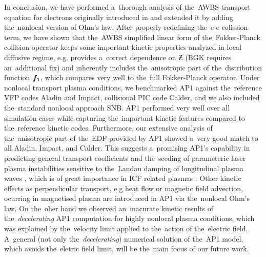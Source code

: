 In conclusion, we have performed a~thorough analysis of the~AWBS transport 
equation for electrons originally introduced in \cite{Sorbo_2015} and extended
it by adding the~nonlocal version of Ohm's law.
After properly redefining the~e-e colission term, we have shown that the~AWBS
simplified linear form of the~Fokker-Planck collision operator keeps
some important kinetic properties analyzed in local diffusive regime, 
e.g. provides a~correct dependence 
on $\Zbar$ (BGK requires an~additional fix) and inherently includes
the~anisotropic part of the~distribution function ${\boldsymbol{f_1}}$, which compares
very well to the~full Fokker-Planck operator.
Under nonlocal transport plasma conditions, we benchmarked AP1 against 
the~reference VFP codes Aladin and Impact, collisional PIC code Calder, 
and we also included the~standard nonlocal approach SNB.
AP1 performed very well over all simulation cases while capturing the~important
kinetic features compared to the~reference kinetic codes. 
Furthermore, our extensive analysis of the~anisotropic part of the~EDF 
provided by AP1 showed a~very good match to all Aladin, Impact, and Calder. 
This suggests 
a~promising AP1's capability in predicting general transport coefficients and 
the~seeding of parameteric laser plasma instabilities sensitive 
to the~Landau damping of longitudinal plasma waves 
\cite{goldston1995introduction, Sorbo_2015},
which is of great importance in ICF related plasmas 
\cite{Kirkwood_NIFLPI_PPCF2013}.
Other kinetic effects as perpendicular transport, e.g heat flow
or magnetic field advection, ocurring in magnetised plasma  
\cite{Walsh_Nernst_PRL2017} are introduced in
AP1 via the~nonlocal Ohm's law. 
On the~oher hand we observed an~inacurate kinetic results of 
the~\textit{decelerating} AP1 computation for highly nonlocal plasma 
conditions, which was explained by the~velocity limit applied to the~action
of the~electric field. A~general (not only the~\textit{decelerating}) numerical
solution of the~AP1 model, which avoids the~eletric field limit, 
will be the~main focus of our future work.

